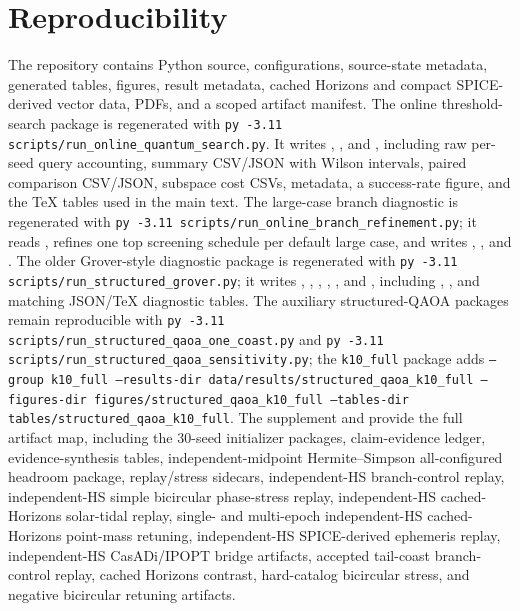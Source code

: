 \documentclass[preprint,12pt]{elsarticle}
\begin{document}
\section{Reproducibility}

The repository contains Python source, configurations, source-state metadata, generated tables, figures, result metadata, cached Horizons and compact SPICE-derived vector data, PDFs, and a scoped artifact manifest. The online threshold-search package is regenerated with \texttt{py -3.11 scripts/run\_online\_quantum\_search.py}. It writes , , and , including raw per-seed query accounting, summary CSV/JSON with Wilson intervals, paired comparison CSV/JSON, subspace cost CSVs, metadata, a success-rate figure, and the TeX tables used in the main text. The large-case branch diagnostic is regenerated with \texttt{py -3.11 scripts/run\_online\_branch\_refinement.py}; it reads , refines one top screening schedule per default large case, and writes , , and . The older Grover-style diagnostic package is regenerated with \texttt{py -3.11 scripts/run\_structured\_grover.py}; it writes , , , , , and , including , , and matching JSON/TeX diagnostic tables. The auxiliary structured-QAOA packages remain reproducible with \texttt{py -3.11 scripts/run\_structured\_qaoa\_one\_coast.py} and \texttt{py -3.11 scripts/run\_structured\_qaoa\_sensitivity.py}; the \texttt{k10\_full} package adds \texttt{--group k10\_full --results-dir data/results/structured\_qaoa\_k10\_full --figures-dir figures/structured\_qaoa\_k10\_full --tables-dir tables/structured\_qaoa\_k10\_full}. The supplement and  provide the full artifact map, including the 30-seed initializer packages, claim-evidence ledger, evidence-synthesis tables, independent-midpoint Hermite--Simpson all-configured headroom package, replay/stress sidecars, independent-HS branch-control replay, independent-HS simple bicircular phase-stress replay, independent-HS cached-Horizons solar-tidal replay, single- and multi-epoch independent-HS cached-Horizons point-mass retuning, independent-HS SPICE-derived ephemeris replay, independent-HS CasADi/IPOPT bridge artifacts, accepted tail-coast branch-control replay, cached Horizons contrast, hard-catalog bicircular stress, and negative bicircular retuning artifacts.
\end{document}
